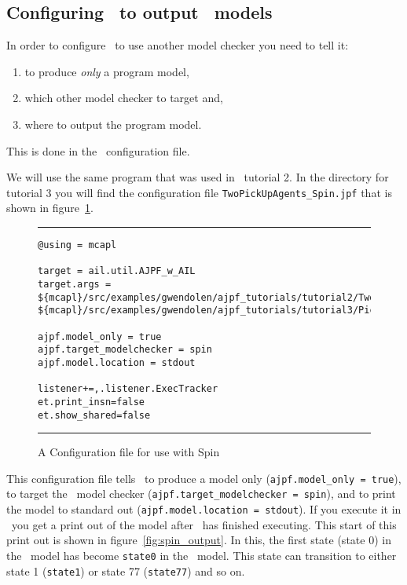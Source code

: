 \documentclass[a4]{article}
\begin{document}
\subsection{Configuring \ajpf\ to output \spin\ models}
\label{sec:configure_spin}

In order to configure \ajpf\ to use another model checker you need to tell it:
\begin{enumerate}
\item to produce \emph{only} a program model, 
\item which other model checker to target and, 
\item where to output the program model.
\end{enumerate}  This is done in the \ajpf\ configuration file.  

We will use the same program that was used in \ajpf\ tutorial 2.  In the directory for tutorial 3 you will find the configuration file \texttt{TwoPickUpAgents\_Spin.jpf} that is shown in figure~\ref{fig:spin_config}.

\begin{figure}[htb]
\noindent\rule{\textwidth}{1pt}
\begin{small}
\begin{verbatim}
@using = mcapl

target = ail.util.AJPF_w_AIL
target.args = ${mcapl}/src/examples/gwendolen/ajpf_tutorials/tutorial2/TwoPickUpAgents.ail,
${mcapl}/src/examples/gwendolen/ajpf_tutorials/tutorial3/PickUpAgent.psl,1

ajpf.model_only = true
ajpf.target_modelchecker = spin
ajpf.model.location = stdout

listener+=,.listener.ExecTracker
et.print_insn=false
et.show_shared=false
\end{verbatim}
\end{small}
\rule{\textwidth}{1pt}
\caption{A Configuration file for use with Spin}
\label{fig:spin_config}
\end{figure}

This configuration file tells \ajpf\ to produce a model only (\texttt{ajpf.model\_only = true}), to target the \spin\ model checker (\texttt{ajpf.target\_modelchecker = spin}), and to print the model to standard out (\texttt{ajpf.model.location = stdout}).  If you execute it in \ajpf\ you get a print out of the model after \ajpf\  has finished executing.  This start of this print out is shown in figure~\ref{fig:spin_output}.
In this, the first state (state 0) in the \ajpf\ model has become \texttt{state0} in the \promela\ model.  This state can transition to either state 1 (\texttt{state1}) or state 77 (\texttt{state77}) and so on.
\end{document}
